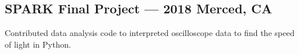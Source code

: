 \documentclass[../Resume.tex]{subfiles}
\begin{document}
	\subsection{SPARK Final Project --- 2018 \null\hfill Merced, CA}
	\par Contributed data analysis code to interpreted oscilloscope data to find the speed of light in Python.
	\vspace*{-2mm}
\end{document}
